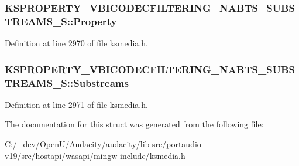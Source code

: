 \subsubsection[{\texorpdfstring{Property}{Property}}]{ K\+S\+P\+R\+O\+P\+E\+R\+T\+Y\+\_\+\+V\+B\+I\+C\+O\+D\+E\+C\+F\+I\+L\+T\+E\+R\+I\+N\+G\+\_\+\+N\+A\+B\+T\+S\+\_\+\+S\+U\+B\+S\+T\+R\+E\+A\+M\+S\+\_\+\+S\+::\+Property}\hypertarget{struct_k_s_p_r_o_p_e_r_t_y___v_b_i_c_o_d_e_c_f_i_l_t_e_r_i_n_g___n_a_b_t_s___s_u_b_s_t_r_e_a_m_s___s_a08fa1d7de19f62e9c88dbaf8380438c3}{}\label{struct_k_s_p_r_o_p_e_r_t_y___v_b_i_c_o_d_e_c_f_i_l_t_e_r_i_n_g___n_a_b_t_s___s_u_b_s_t_r_e_a_m_s___s_a08fa1d7de19f62e9c88dbaf8380438c3}


Definition at line 2970 of file ksmedia.\+h.

\subsubsection[{\texorpdfstring{Substreams}{Substreams}}]{ K\+S\+P\+R\+O\+P\+E\+R\+T\+Y\+\_\+\+V\+B\+I\+C\+O\+D\+E\+C\+F\+I\+L\+T\+E\+R\+I\+N\+G\+\_\+\+N\+A\+B\+T\+S\+\_\+\+S\+U\+B\+S\+T\+R\+E\+A\+M\+S\+\_\+\+S\+::\+Substreams}\hypertarget{struct_k_s_p_r_o_p_e_r_t_y___v_b_i_c_o_d_e_c_f_i_l_t_e_r_i_n_g___n_a_b_t_s___s_u_b_s_t_r_e_a_m_s___s_aacaa0e1fef855f005bcca7f99cc02c7b}{}\label{struct_k_s_p_r_o_p_e_r_t_y___v_b_i_c_o_d_e_c_f_i_l_t_e_r_i_n_g___n_a_b_t_s___s_u_b_s_t_r_e_a_m_s___s_aacaa0e1fef855f005bcca7f99cc02c7b}


Definition at line 2971 of file ksmedia.\+h.



The documentation for this struct was generated from the following file\+:\begin{DoxyCompactItemize}
\item 
C\+:/\+\_\+dev/\+Open\+U/\+Audacity/audacity/lib-\/src/portaudio-\/v19/src/hostapi/wasapi/mingw-\/include/\hyperlink{ksmedia_8h}{ksmedia.\+h}\end{DoxyCompactItemize}
